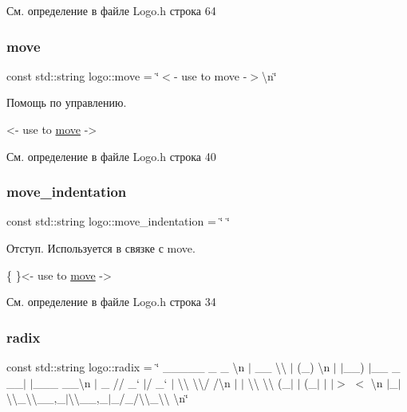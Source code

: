 См. определение в файле Logo.\+h строка 64

\mbox{\label{namespacelogo_a03b6b80b5648e7dbbbf00b258df733b6}} 
\subsubsection{\texorpdfstring{move}{move}}
{\footnotesize\ttfamily const std\+::string logo\+::move = \char`\"{}$<$-\/ use to move -\/$>$\textbackslash{}n\char`\"{}}

Помощь по управлению. 
\begin{DoxyCode}
<- use to \hyperlink{namespacelogo_a03b6b80b5648e7dbbbf00b258df733b6}{move} ->
\end{DoxyCode}
 

См. определение в файле Logo.\+h строка 40

\mbox{\label{namespacelogo_a7570bf74bf945a06ced26f6fccaeab53}} 
\subsubsection{\texorpdfstring{move\+\_\+indentation}{move\_indentation}}
{\footnotesize\ttfamily const std\+::string logo\+::move\+\_\+indentation = \char`\"{} \char`\"{}}

Отступ. Используется в связке с move. 
\begin{DoxyCode}
\{       \}<- use to \hyperlink{namespacelogo_a03b6b80b5648e7dbbbf00b258df733b6}{move} ->
\end{DoxyCode}
 

См. определение в файле Logo.\+h строка 34

\mbox{\label{namespacelogo_abbbdbfbbcae50e2017f3ed1bdf0e1fa3}} 
\subsubsection{\texorpdfstring{radix}{radix}}
{\footnotesize\ttfamily const std\+::string logo\+::radix = \char`\"{} \+\_\+\+\_\+\+\_\+\+\_\+\+\_\+ \+\_\+ \+\_\+ \textbackslash{}n $\vert$ \+\_\+\+\_\+ \textbackslash{}\textbackslash{} $\vert$ (\+\_\+) \textbackslash{}n $\vert$ $\vert$\+\_\+\+\_\+) $\vert$\+\_\+\+\_\+ \+\_\+ \+\_\+\+\_\+$\vert$ $\vert$\+\_\+\+\_\+\+\_\+ \+\_\+\+\_\+\textbackslash{}n $\vert$ \+\_\+ // \+\_\+` $\vert$/ \+\_\+` $\vert$ \textbackslash{}\textbackslash{} \textbackslash{}\textbackslash{}/ /\textbackslash{}n $\vert$ $\vert$ \textbackslash{}\textbackslash{} \textbackslash{}\textbackslash{} (\+\_\+$\vert$ $\vert$ (\+\_\+$\vert$ $\vert$ $\vert$$>$ $<$ \textbackslash{}n $\vert$\+\_\+$\vert$ \textbackslash{}\textbackslash{}\+\_\+\textbackslash{}\textbackslash{}\+\_\+\+\_\+,\+\_\+$\vert$\textbackslash{}\textbackslash{}\+\_\+\+\_\+,\+\_\+$\vert$\+\_\+/\+\_\+/\textbackslash{}\textbackslash{}\+\_\+\textbackslash{}\textbackslash{} \textbackslash{}n\char`\"{}}

